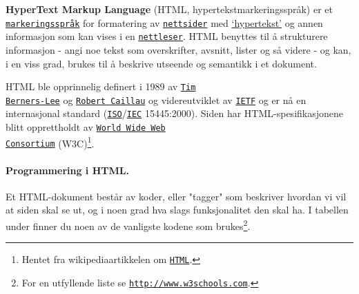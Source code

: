 \documentclass[%
oneside,                 %
final,                   %
10pt]{article}
\begin{document}
\textbf{HyperText Markup Language} (HTML, hypertekstmarkeringsspråk) er et
\href{{http://no.wikipedia.org/wiki/Markeringsspråk}}{\nolinkurl{markeringsspråk}} for
formatering av \href{{http://no.wikipedia.org/wiki/Nettside}}{\nolinkurl{nettsider}}
med \href{{http://no.wikipedia.org/wiki/Hypertekst}}{`hypertekst'} og annen
informasjon som kan vises i en
\href{{http://no.wikipedia.org/wiki/Nettleser}}{\nolinkurl{nettleser}}. HTML benyttes
til å strukturere informasjon - angi noe tekst som overskrifter,
avsnitt, lister og så videre - og kan, i en viss grad, brukes til å
beskrive utseende og semantikk i et dokument.

HTML ble opprinnelig definert i 1989 av \href{{https://no.wikipedia.org/wiki/Tim_Berners-Lee}}{\nolinkurl{Tim
Berners-Lee}} og
\href{{https://en.wikipedia.org/wiki/Robert_Cailliau}}{\nolinkurl{Robert Caillau}} og
videreutviklet av \href{{http://no.wikipedia.org/wiki/IETF}}{\nolinkurl{IETF}} og er
nå en internasjonal standard
(\href{{http://no.wikipedia.org/wiki/International_Organization_for_Standardization}}{\nolinkurl{ISO}}/\href{{http://no.wikipedia.org/wiki/International_Electrotechnical_Commission}}{\nolinkurl{IEC}}
15445:2000). Siden har HTML-spesifikasjonene blitt opprettholdt av
\href{{http://no.wikipedia.org/wiki/World_Wide_Web_Consortium}}{\nolinkurl{World Wide Web
Consortium}}
(W3C)\footnote{Hentet fra wikipediaartikkelen om \href{{http://no.wikipedia.org/wiki/HTML}}{\nolinkurl{HTML}}.}. 



\paragraph{Programmering i HTML.}

Et HTML-dokument består av koder, eller "tagger" som beskriver hvordan
vi vil at siden skal se ut, og i noen grad hva slags funksjonalitet
den skal ha. I tabellen under finner du noen av de vanligste kodene
som brukes\footnote{For en utfyllende liste se \href{{http://www.w3schools.com/tags/ref_byfunc.asp}}{\nolinkurl{http://www.w3schools.com}}.}.
\end{document}
